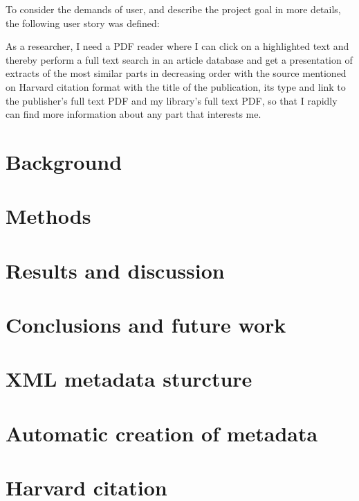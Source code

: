 \documentclass[a4paper,twocolumn,twoside]{article}
\begin{document}
	To consider the demands of user, and describe the project goal in more details, the following user story was defined:
	
	As a researcher, I need a PDF reader where I can click on a highlighted text and thereby perform a full text search in an article database and get a presentation of extracts of the most similar parts in decreasing order with the source mentioned on Harvard citation format with the title of the publication, its type and link to the publisher’s full text PDF and my library’s full text PDF, so that I rapidly can find more information about any part that interests me.
	

		
	\section{Background}
	\label{Background}
	


	\section{Methods}
	\label{Methods}
	
	
	
	
	
	\section{Results and discussion}
	\label{Results and discussion}

	\section{Conclusions and future work}
	\label{Conclusions and future work}
    
    
    

	\appendix
	\section{XML metadata sturcture}
	\label{XML}
	
	
	\section{Automatic creation of metadata}
	\label{metadata_creation}
	
	
	\section{Harvard citation}
	\label{Harvard}
	

		
	
		
	\clearpage 
\end{document}
